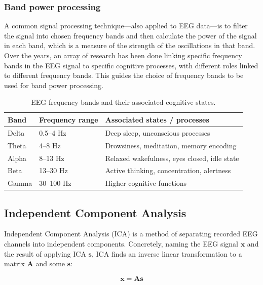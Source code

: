 \subsubsection{Band power processing}

A common signal processing technique---also applied to EEG data---is to filter the signal into chosen frequency bands and then calculate the power of the signal in each band, which is a measure of the strength of the oscillations in that band.
Over the years, an array of research has been done linking specific frequency bands in the EEG signal to specific cognitive processes, with different roles linked to different frequency bands\cite{basar}.
This guides the choice of frequency bands to be used for band power processing.

\begin{table}[h]
\centering
\begin{tabular}{lll}
\hline
\textbf{Band} & \textbf{Frequency range} & \textbf{Associated states / processes} \\
\hline
Delta   & 0.5--4 Hz  & Deep sleep, unconscious processes\cite{harmony} \\
Theta   & 4--8 Hz    & Drowsiness\cite{lal}, meditation\cite{lagapulos}, memory encoding\cite{klimesch} \\
Alpha   & 8--13 Hz   & Relaxed wakefulness, eyes closed, idle state\cite{alastair} \\
Beta    & 13--30 Hz  & Active thinking, concentration, alertness\cite{engel}\cite{ray} \\
Gamma   & 30--100 Hz & Higher cognitive functions\cite{bertrand}\cite{fries} \\
\hline
\end{tabular}
\caption{EEG frequency bands and their associated cognitive states.}
\label{tab:eeg_bands}
\end{table}

\subsection{Independent Component Analysis}

Independent Component Analysis (ICA) is a method of separating recorded EEG channels into independent components.
Concretely, naming the EEG signal \( \mathbf{x} \) and the result of applying ICA \( \mathbf{s} \), ICA finds an inverse linear transformation to a matrix \( \mathbf{A} \) and some \( \mathbf{s} \):

\[
\mathbf{x} = \mathbf{A}\mathbf{s}
\]

